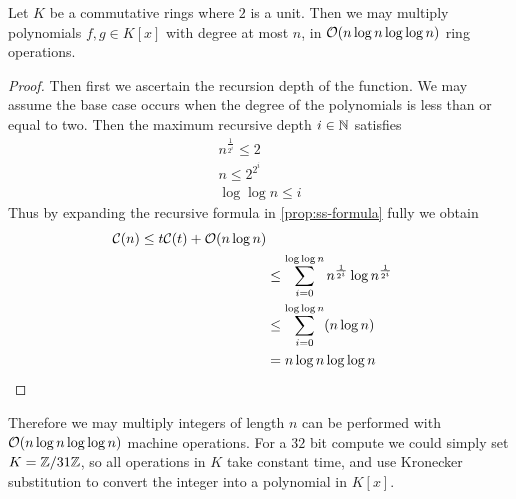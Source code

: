 \begin{theorem}
    Let $K$ be a commutative rings where $2$ is a unit. Then we may multiply polynomials $f, g \in K[x]$ with degree at most $n$, in $\mathcal O(n \log n \log \log n)$ ring operations.
\end{theorem}

\begin{proof}
    Then first we ascertain the recursion depth of the function. We may assume the base case occurs when the degree of the polynomials is less than or equal to two. Then the maximum recursive depth $i \in {\mathbb N}$ satisfies
    \begin{align*}
        n^{\frac{1}{2^i}} \le 2\\
        n \le 2^{2^i}\\
        \log \log n \le i
    \end{align*}
    Thus by expanding the recursive formula in \ref{prop:ss-formula} fully we obtain
    \begin{align*}
        \mathcal C(n) \le t\mathcal C(t) + \mathcal O(n \log n)\\
        &\le \sum^{\log \log n}_{i=0} n^{\frac{1}{2^i}} \log n^{\frac{1}{2^i}}\\
        &\le \sum^{\log \log n}_{i=0} (n \log n)\\
        &= n \log n \log \log n
    \end{align*}
\end{proof}

Therefore we may multiply integers of length $n$ can be performed with $\mathcal O(n \log n \log \log n)$ machine operations. For a $32$ bit compute we could simply set $K = {\mathbb Z} / 31{\mathbb Z}$, so all operations in $K$ take constant time, and use Kronecker substitution to convert the integer into a polynomial in $K[x]$.
